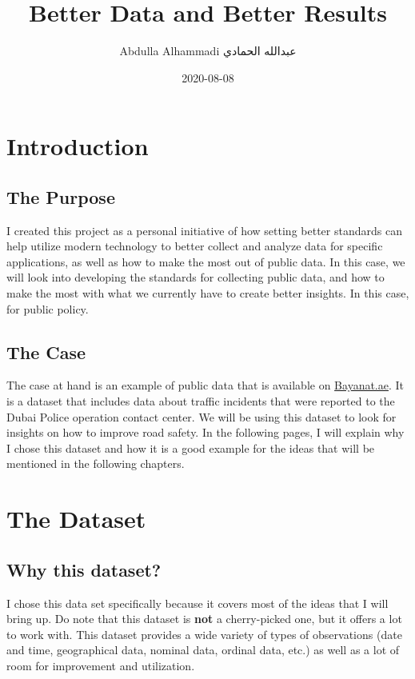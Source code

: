 \documentclass[
]{book}
\title{Better Data and Better Results}
\author{Abdulla Alhammadi \textbar{} عبدالله الحمادي}
\date{2020-08-08}
\begin{document}
\maketitle

{
\setcounter{tocdepth}{1}
\tableofcontents
}
\hypertarget{intro}{%
\chapter{Introduction}\label{intro}}

\hypertarget{the-purpose}{%
\section{The Purpose}\label{the-purpose}}

I created this project as a personal initiative of how setting better standards can help utilize modern technology to better collect and analyze data for specific applications, as well as how to make the most out of public data. In this case, we will look into developing the standards for collecting public data, and how to make the most with what we currently have to create better insights. In this case, for public policy.

\hypertarget{the-case}{%
\section{The Case}\label{the-case}}

The case at hand is an example of public data that is available on \href{https://bayanat.ae}{Bayanat.ae}. It is a dataset that includes data about traffic incidents that were reported to the Dubai Police operation contact center. We will be using this dataset to look for insights on how to improve road safety. In the following pages, I will explain why I chose this dataset and how it is a good example for the ideas that will be mentioned in the following chapters.

\hypertarget{the-dataset}{%
\chapter{The Dataset}\label{the-dataset}}

\hypertarget{why-this-dataset}{%
\section{Why this dataset?}\label{why-this-dataset}}

I chose this data set specifically because it covers most of the ideas that I will bring up. Do note that this dataset is \textbf{not} a cherry-picked one, but it offers a lot to work with. This dataset provides a wide variety of types of observations (date and time, geographical data, nominal data, ordinal data, etc.) as well as a lot of room for improvement and utilization.
\end{document}
